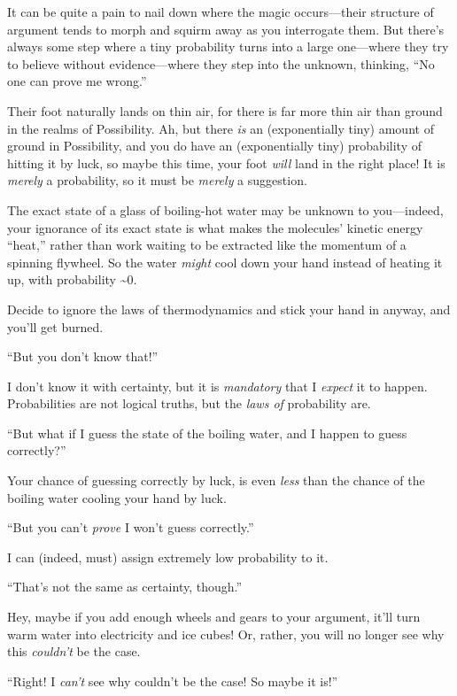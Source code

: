 {
 It can be quite a pain to nail down where the magic occurs---their
structure of argument tends to morph and squirm away as you interrogate
them. But there's always some step where a tiny
probability turns into a large one---where they try to believe without
evidence---where they step into the unknown, thinking,
``No one can prove me wrong.''}

{
 Their foot naturally lands on thin air, for there is far more thin
air than ground in the realms of Possibility. Ah, but there \textit{is}
an (exponentially tiny) amount of ground in Possibility, and you do
have an (exponentially tiny) probability of hitting it by luck, so
maybe this time, your foot \textit{will} land in the right place! It is
\textit{merely} a probability, so it must be \textit{merely} a
suggestion.}

{
 The exact state of a glass of boiling-hot water may be unknown to
you---indeed, your ignorance of its exact state is what makes the
molecules' kinetic energy
``heat,'' rather than work waiting
to be extracted like the momentum of a spinning flywheel. So the water
\textit{might} cool down your hand instead of heating it up, with
probability \~{}0.}

{
 Decide to ignore the laws of thermodynamics and stick your hand in
anyway, and you'll get burned.}

{
 ``But you don't know
that!''}

{
 I don't know it with certainty, but it is
\textit{mandatory} that I \textit{expect} it to happen. Probabilities
are not logical truths, but the \textit{laws of} probability are.}

{
 ``But what if I guess the state of the boiling
water, and I happen to guess correctly?''}

{
 Your chance of guessing correctly by luck, is even \textit{less}
than the chance of the boiling water cooling your hand by luck.}

{
 ``But you can't \textit{prove} I
won't guess correctly.''}

{
 I can (indeed, must) assign extremely low probability to it.}

{
 ``That's not the same as
certainty, though.''}

{
 Hey, maybe if you add enough wheels and gears to your argument,
it'll turn warm water into electricity and ice cubes!
Or, rather, you will no longer see why this
\textit{couldn't} be the case.}

{
 ``Right! I \textit{can't} see why
couldn't be the case! So maybe it
is!''}

